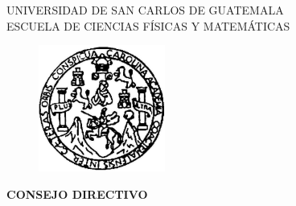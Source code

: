 \thispagestyle{empty}

\begin{center}
UNIVERSIDAD DE SAN CARLOS DE GUATEMALA\\[6pt] ESCUELA DE CIENCIAS FÍSICAS Y MATEMÁTICAS
\end{center}

\begin{figure}[H]
  \begin{center}
    \includegraphics[width=4.15cm]{../Images/escudo-eps-converted-to.jpg}\\
  \end{center}
\end{figure}

\begin{center}
\textbf{CONSEJO DIRECTIVO}
\end{center}

